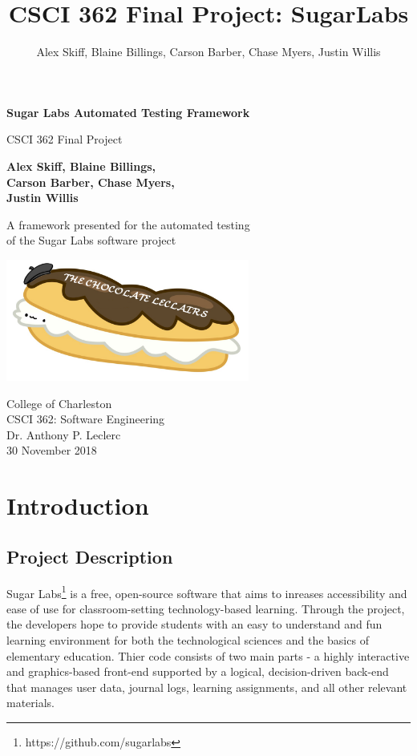 \documentclass{article}
\title{CSCI 362 Final Project: SugarLabs}
\author{Alex Skiff, Blaine Billings, Carson Barber, Chase Myers, Justin Willis}
\date{ }
\begin{document}
\begin{titlepage}
    \begin{center}
        \vspace*{1cm}
 
        \Huge
        \textbf{Sugar Labs Automated Testing Framework}
 
        \vspace{0.5cm}
        \LARGE
        CSCI 362 Final Project
 
        \vspace{1.5cm}
 
        \textbf{Alex Skiff, Blaine Billings,}\\
        \textbf{Carson Barber, Chase Myers,}\\
        \textbf{Justin Willis}
 
        \vfill
 
        A framework presented for the automated testing\\
        of the Sugar Labs software project
 
        \vspace{0.8cm}
 
		\includegraphics[width=0.6\textwidth]{../imgs/ChocolateLeclairs.png}

        \Large
        College of Charleston\\
        CSCI 362: Software Engineering\\
        Dr. Anthony P. Leclerc\\
        30 November 2018
 
    \end{center}
\end{titlepage}
 
\tableofcontents

\newpage

\section{Introduction}
\subsection{Project Description}
Sugar Labs\footnote{https://github.com/sugarlabs} is a free, open-source software that aims to inreases accessibility and ease of use for classroom-setting technology-based learning. Through the project, the developers hope to provide students with an easy to understand and fun learning environment for both the technological sciences and the basics of elementary education. Thier code consists of two main parts - a highly interactive and graphics-based front-end supported by a logical, decision-driven back-end that manages user data, journal logs, learning assignments, and all other relevant materials.
\end{document}
